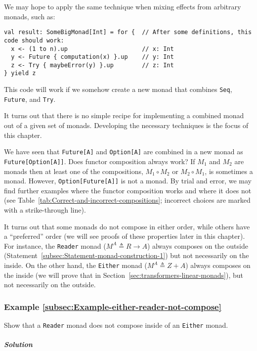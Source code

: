 We may hope to apply the same technique when mixing effects from arbitrary
monads, such as:
\begin{lstlisting}
val result: SomeBigMonad[Int] = for {  // After some definitions, this code should work:
  x <- (1 to n).up                     // x: Int
  y <- Future { computation(x) }.up    // y: Int
  z <- Try { maybeError(y) }.up        // z: Int
} yield z
\end{lstlisting}
This code will work if we somehow create a new monad that combines
\lstinline!Seq!, \lstinline!Future!, and \lstinline!Try!. 

It turns out that there is no simple recipe for implementing a combined
monad out of a given set of monads. Developing the necessary techniques
is the focus of this chapter.

We have seen that \lstinline!Future[A]! and \lstinline!Option[A]!
are combined in a new monad as \lstinline!Future[Option[A]]!. Does
functor composition always work? If $M_{1}$ and $M_{2}$ are monads
then at least one of the compositions, $M_{1}\circ M_{2}$ or $M_{2}\circ M_{1}$,
is sometimes a monad. However, \lstinline!Option[Future[A]]! is not
a monad. By trial and error, we may find further examples where the
functor composition works and where it does not (see Table~\ref{tab:Correct-and-incorrect-compositions};
incorrect choices are marked with a strike-through line).

It turns out that some monads do not compose in either order, while
others have a \textsf{``}preferred\textsf{''} order (we will see proofs of these properties
later in this chapter). For instance, the \lstinline!Reader! monad
($M^{A}\triangleq R\rightarrow A$) always composes on the outside
(Statement~\ref{subsec:Statement-monad-construction-1}) but not
necessarily on the inside. On the other hand, the \lstinline!Either!
monad ($M^{A}\triangleq Z+A$) always composes on the inside (we will
prove that in Section~\ref{sec:transformers-linear-monads}), but
not necessarily on the outside.

\subsubsection{Example \label{subsec:Example-either-reader-not-compose}\ref{subsec:Example-either-reader-not-compose}}

Show that a \lstinline!Reader! monad does not compose inside of an
\lstinline!Either! monad.

\subparagraph{Solution}

